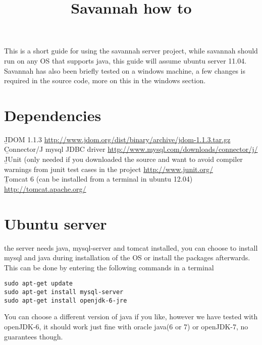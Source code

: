 
\title{Savannah how to}


\maketitle
This is a short guide for using the savannah server project, while savannah should run on any OS that supports java, this guide will assume 
ubuntu server 11.04. Savannah has also been briefly tested on a windows machine, a few changes is required in the source code, more on this in the windows section.
\part*{Dependencies}
\label{depends}

\b{JDOM 1.1.3} \newline
\url{http://www.jdom.org/dist/binary/archive/jdom-1.1.3.tar.gz} \newline \\
\b{Connector/J mysql JDBC driver} \newline
\url{http://www.mysql.com/downloads/connector/j/}\newline \\
\b{JUnit} (only needed if you downloaded the source and want to avoid compiler warnings from junit test cases in the project \newline
\url{http://www.junit.org/} \newline \\
\b{Tomcat 6} (can be installed from a terminal in ubuntu 12.04) \newline
\url{http://tomcat.apache.org/} \newline


\part*{Ubuntu server}
the server needs java, mysql-server and tomcat installed, you can choose to install mysql and java during installation of the OS or install the packages afterwards.
This can be done by entering the following commands in a terminal
\begin{verbatim}
sudo apt-get update
sudo apt-get install mysql-server
sudo apt-get install openjdk-6-jre
\end{verbatim}

You can choose a different version of java if you like, however we have tested with openJDK-6, it should work just fine with oracle java(6 or 7) or openJDK-7, no guarantees though.

